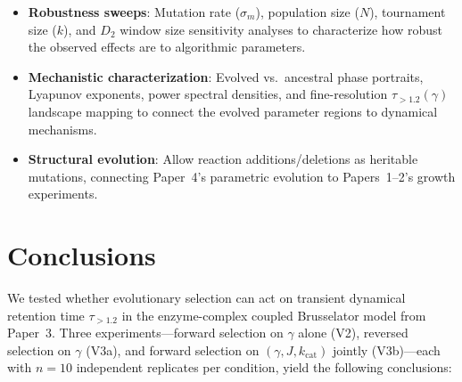\documentclass[twocolumn,showpacs,preprintnumbers,amsmath,amssymb,prd,floatfix]{revtex4-2}
\newcommand{\tauexp}{\tau_{>1.2}}
\newcommand{\Dtwo}{D_2}
\newcommand{\kcat}{k_{\mathrm{cat}}}
\begin{document}
\begin{itemize}
\item \textbf{Robustness sweeps}: Mutation rate ($\sigma_m$), population size ($N$), tournament size ($k$), and $\Dtwo$ window size sensitivity analyses to characterize how robust the observed effects are to algorithmic parameters.

\item \textbf{Mechanistic characterization}: Evolved vs.\ ancestral phase portraits, Lyapunov exponents, power spectral densities, and fine-resolution $\tauexp(\gamma)$ landscape mapping to connect the evolved parameter regions to dynamical mechanisms.

\item \textbf{Structural evolution}: Allow reaction additions/deletions as heritable mutations, connecting Paper~4's parametric evolution to Papers~1--2's growth experiments.
\end{itemize}

\section{Conclusions}
\label{sec:conclusions}

We tested whether evolutionary selection can act on transient dynamical retention time $\tauexp$ in the enzyme-complex coupled Brusselator model from Paper~3. Three experiments---forward selection on $\gamma$ alone (V2), reversed selection on $\gamma$ (V3a), and forward selection on $(\gamma, J, \kcat)$ jointly (V3b)---each with $n = 10$ independent replicates per condition, yield the following conclusions:
\end{document}
